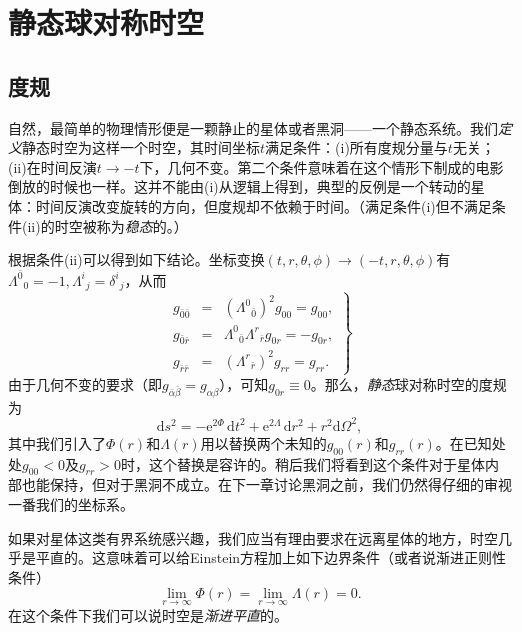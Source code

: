 \section{静态球对称时空}\label{sec10.2}
\subsection*{度规}
自然，最简单的物理情形便是一颗静止的星体或者黑洞——一个静态系统。我们{\it 定义}静态时空为这样一个时空，其时间坐标$t$满足条件：(i)所有度规分量与$t$无关；(ii)在时间反演$t\rightarrow -t$下，几何不变。第二个条件意味着在这个情形下制成的电影倒放的时候也一样。这并不能由(i)从逻辑上得到，典型的反例是一个转动的星体：时间反演改变旋转的方向，但度规却不依赖于时间。（满足条件(i)但不满足条件(ii)的时空被称为{\it 稳态}的。）

根据条件(ii)可以得到如下结论。坐标变换$(t,r,\theta,\phi)\rightarrow (-t,r,\theta,\phi)$有${\Lambda^{\bar 0}}_0=-1,{\Lambda^i}_j={\delta^i}_j$，从而
\begin{equation}
\left.\begin{array}{rcl}
g_{\bar 0\bar 0} &=& ({\Lambda^0}_{\bar 0})^2g_{00}=g_{00},\\
g_{\bar 0\bar r} &=& {\Lambda^0}_{\bar 0}{\Lambda^r}_{\bar r}g_{0r}=-g_{0r},\\
g_{\bar r\bar r} &=& ({\Lambda^r}_{\bar r})^2g_{rr}=g_{rr}.
\end{array}\right\}
\end{equation}
由于几何不变的要求（即$g_{\bar \alpha\bar\beta}=g_{\alpha\beta}$），可知$g_{0r}\equiv 0$。那么，{\it 静态}球对称时空的度规为
\begin{equation}
\mathrm ds^2=-\mathrm e^{2\Phi}\,\mathrm dt^2+\mathrm e^{2\Lambda}\,\mathrm dr^2+r^2\mathrm d\Omega^2,
\label{equ10.7}
\end{equation}
其中我们引入了$\Phi(r)$和$\Lambda(r)$用以替换两个未知的$g_{00}(r)$和$g_{rr}(r)$。在已知处处$g_{00}<0$及$g_{rr}>0$时，这个替换是容许的。稍后我们将看到这个条件对于星体内部也能保持，但对于黑洞不成立。在下一章讨论黑洞之前，我们仍然得仔细的审视一番我们的坐标系。

如果对星体这类有界系统感兴趣，我们应当有理由要求在远离星体的地方，时空几乎是平直的。这意味着可以给Einstein方程加上如下边界条件（或者说渐进正则性条件）
\begin{equation}
\lim_{r\rightarrow \infty}\Phi(r)=\lim_{r\rightarrow \infty}\Lambda(r)=0.
\end{equation}
在这个条件下我们可以说时空是{\it 渐进平直}的。

